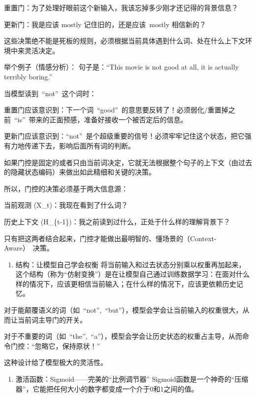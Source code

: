 重置门：为了处理好眼前这个新输入，我该忘掉多少刚才还记得的背景信息？

更新门：我是应该 mostly 记住旧的，还是应该~mostly 相信新的？

这些决策绝不能是死板的规则，必须根据当前具体遇到什么词、处在什么上下文环境中来灵活决定。

举个例子（情感分析）：
句子是：``This movie is not good at all, it is actually terribly boring.''

当模型读到~``not''~这个词时：

重置门应该意识到：下一个词~``good''~的意思要反转了！必须弱化/重置掉之前~``is''~带来的正面预感，准备好接收一个被否定后的信息。

更新门应该意识到：``not''~是个超级重要的信号！必须牢牢记住这个状态，把它强有力地传递下去，影响后面所有词的判断。

如果门控是固定的或者只由当前词决定，它就无法根据整个句子的上下文（由过去的隐藏状态编码）来做出如此精细和关键的决策。

所以，门控的决策必须基于两大信息源：

当前观测 (X\_t)：我现在看到了什么词？

历史上下文 (H\_\{t-1\})：我之前读到过什么，正处于什么样的理解背景下？

只有把这两者结合起来，门控才能做出最明智的、懂场景的（Context-Aware）~决策。

\begin{enumerate}
\def\labelenumi{\arabic{enumi}.}
\setcounter{enumi}{1}
\tightlist
\item
  结构：让模型自己学会权衡
  将当前输入和过去状态分别乘以权重再加起来，这个结构（称为``仿射变换''）是在让模型自己通过训练数据学习：在面对什么样的情况下，应该更相信当前输入；在什么样的情况下，应该更依赖历史记忆。
\end{enumerate}

对于能颠覆语义的词（如~``not'',~``but''），模型会学会让当前输入的权重很大，从而让当前词主导门的开关。

对于不重要的词（如~``the'',~``a''），模型会学会让历史状态的权重占主导，从而命令门控：``忽略它，保持原状！''

这种设计给了模型极大的灵活性。

\begin{enumerate}
\def\labelenumi{\arabic{enumi}.}
\setcounter{enumi}{2}
\tightlist
\item
  激活函数：Sigmoid------完美的``比例调节器''
  Sigmoid函数是一个神奇的``压缩器''，它能把任何大小的数字都变成一个介于0和1之间的值。
\end{enumerate}

